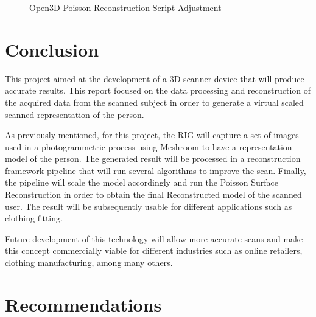 \documentclass[12pt]{report}
\begin{document}
\begin{figure}[H]
\caption{Open3D Poisson Reconstruction Script Adjustment}
\label{fig:open3dpossionscreipt_result} 
\end{figure}











\chapter{Conclusion}
This project aimed at the development of a 3D scanner device that will produce accurate results. 
This report focused on the data processing and reconstruction of the acquired data from the scanned subject in order to generate a virtual scaled scanned representation of the person.

As previously mentioned, for this project, the RIG will capture a set of images used in a photogrammetric process using Meshroom to have a representation model of the person. 
The generated result will be processed in a reconstruction framework pipeline that will run several algorithms to improve the scan. 
Finally, the pipeline will scale the model accordingly and run the Poisson Surface Reconstruction in order to obtain the final Reconstructed model of the scanned user. 
The result will be subsequently usable for different applications such as clothing fitting. 

Future development of this technology will allow more accurate scans and make this concept commercially viable for different industries such as online retailers, clothing manufacturing, among many others.


\chapter{Recommendations}
\end{document}
